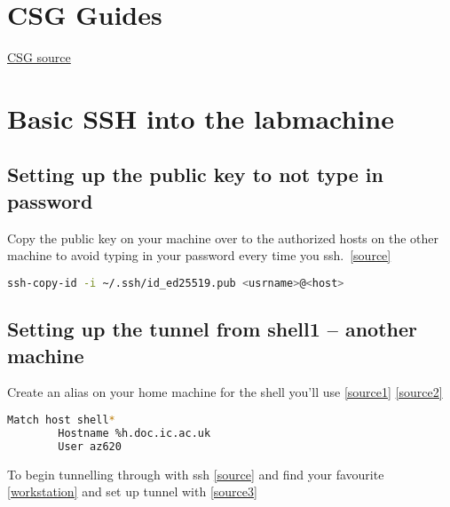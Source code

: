 \documentclass[11pt]{article}
\begin{document}


\tableofcontents

\clearpage

\section{CSG Guides}

\href{https://www.imperial.ac.uk/computing/people/csg/guides/}{CSG source}

\section{Basic SSH into the labmachine}

\subsection{Setting up the public key to not type in password}

Copy the public key on your machine over to the authorized hosts on the other machine to avoid typing in your password every time you ssh.\ \href{https://superuser.com/questions/8077/how-do-i-set-up-ssh-so-i-dont-have-to-type-my-password}{[source]}

\begin{lstlisting}[language=sh]
    ssh-copy-id -i ~/.ssh/id_ed25519.pub <usrname>@<host>
\end{lstlisting}

\subsection{Setting up the tunnel from shell1 -- another machine}

Create an alias on your home machine for the shell you'll use \href{https://ostechnix.com/how-to-create-ssh-alias-in-linux/}{[source1]} \href{https://stackoverflow.com/questions/17169292/using-only-part-of-a-pattern-in-ssh-config-hostname}{[source2]}

\begin{lstlisting}[language=bash]
    Match host shell*
        Hostname %h.doc.ic.ac.uk
        User az620
\end{lstlisting}

\noindent To begin tunnelling through with ssh \href{https://www.imperial.ac.uk/computing/csg/guides/remote-access/ssh/}{[source]} and find your favourite \href{https://www.imperial.ac.uk/computing/people/csg/facilities/lab/workstations/}{[workstation]} and set up tunnel with \href{https://superuser.com/questions/107679/forward-ssh-traffic-through-a-middle-machine}{[source3]}
\end{document}
